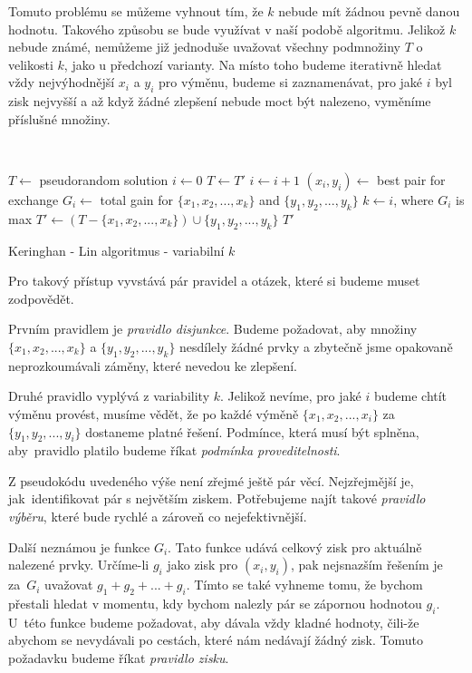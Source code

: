 \documentclass[
  biblatex,
  figures=false,
  glossaries,
  index
]{kidiplom}
\begin{document}
Tomuto problému se můžeme vyhnout tím, že $k$ nebude mít žádnou pevně danou hodnotu. Takového způsobu se bude využívat v naší podobě algoritmu. Jelikož $k$ nebude známé, nemůžeme již jednoduše uvažovat všechny podmnožiny $T$ o velikosti $k$, jako u předchozí varianty. Na místo toho budeme iterativně hledat vždy nejvýhodnější $x_i$ a $y_i$ pro výměnu, budeme si zaznamenávat, pro jaké $i$ byl zisk nejvyšší a až když žádné zlepšení nebude moct být nalezeno, vyměníme příslušné množiny.
\newline

{\LinesNumbered\SetAlgoNoLine\
\begin{algorithm}[H]
%
$T \leftarrow$ pseudorandom solution\;
{
$i \leftarrow 0$\;
$T \leftarrow T'$\;
{
$i \leftarrow i + 1$\;
$(x_i, y_i) \leftarrow$ best pair for exchange\;
$G_i \leftarrow$ total gain for $\{x_1, x_2, ..., x_k\}$ and $\{y_1, y_2, ..., y_k\}$\;
}
$k \leftarrow i$, where $G_i$ is max \;
$T' \leftarrow (T - \{x_1, x_2, ..., x_k\}) \cup \{y_1, y_2, ..., y_k\}$\;
}
\Return $T'$\;
\caption{Keringhan - Lin algoritmus - variabilní $k$}
\end{algorithm}
}\leavevmode\newline

\leavevmode\newline\leavevmode\newline
Pro takový přístup vyvstává pár pravidel a otázek, které si budeme muset zodpovědět.

Prvním pravidlem je \textit{pravidlo disjunkce}. Budeme požadovat, aby množiny $\{x_1, x_2, ..., x_k\}$ a $\{y_1, y_2, ..., y_k\}$ nesdílely žádné prvky a zbytečně jsme opakovaně neprozkoumávali záměny, které nevedou ke zlepšení.

Druhé pravidlo vyplývá z variability $k$. Jelikož nevíme, pro jaké $i$ budeme chtít výměnu provést, musíme vědět, že po každé výměně $\{x_1, x_2, ..., x_i\}$ za~$\{y_1, y_2, ..., y_i\}$ dostaneme platné řešení. Podmínce, která musí být splněna, aby~pravidlo platilo budeme říkat \textit{podmínka proveditelnosti}.

Z pseudokódu uvedeného výše není zřejmé ještě pár věcí. Nejzřejmější je, jak~identifikovat pár s největším ziskem. Potřebujeme najít takové \textit{pravidlo výběru}, které bude rychlé a zároveň co nejefektivnější.

Další neznámou je funkce $G_i$. Tato funkce udává celkový zisk pro aktuálně nalezené prvky. Určíme-li $g_i$ jako zisk pro $(x_i, y_i)$, pak nejsnazším řešením je za~$G_i$ uvažovat $g_1 + g_2 + ... + g_i$. Tímto se také vyhneme tomu, že bychom přestali hledat v momentu, kdy bychom nalezly pár se zápornou hodnotou $g_i$. U~této funkce budeme požadovat, aby dávala vždy kladné hodnoty, čili-že abychom se nevydávali po cestách, které nám nedávají žádný zisk. Tomuto požadavku budeme říkat \textit{pravidlo zisku}.
\end{document}
